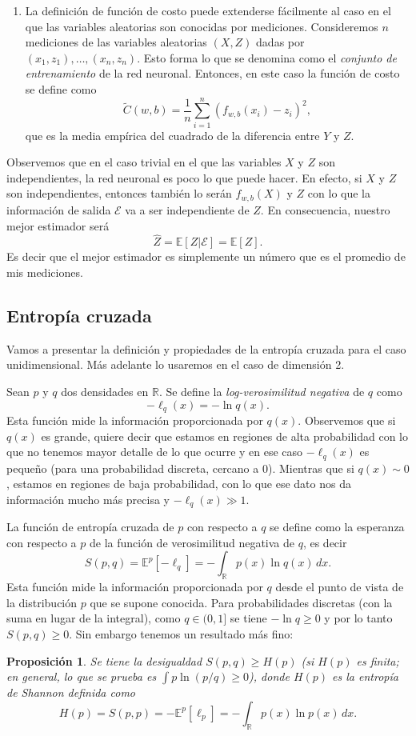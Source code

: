 \documentclass[12pt, a4paper]{amsbook}
\newcommand{\R}{{\mathbb R}}
\newcommand{\E}{{\mathbb E}}
\newtheorem{prop}[teo]{Proposici\'on}
\theoremstyle{remark}
\theoremstyle{definition}
\numberwithin{section}{chapter}
\numberwithin{subsection}{section}
\numberwithin{equation}{section}
\numberwithin{figure}{chapter}
\begin{document}
\begin{enumerate}
\item La definición de función de costo puede extenderse fácilmente al caso en el que las variables aleatorias son conocidas por mediciones. Consideremos $n$ mediciones de las variables aleatorias $(X, Z)$ dadas por $(x_1, z_1),\dots,(x_n,z_n)$. Esto forma lo que se denomina como el {\em conjunto de entrenamiento} de la red neuronal. Entonces, en este caso la función de costo se define como 
$$
\tilde C(w, b) = \frac{1}{n}\sum_{i=1}^n (f_{w, b}(x_i)-z_i)^2,
$$
que es la media empírica del cuadrado de la diferencia entre $Y$ y $Z$.
\end{enumerate}

Observemos que en el caso trivial en el que las variables $X$ y $Z$ son independientes, la red neuronal es poco lo que puede hacer. En efecto, si $X$ y $Z$ son independientes, entonces también lo serán $f_{w, b}(X)$ y $Z$ con lo que la información de salida $\mathcal E$ va a ser independiente de $Z$. En consecuencia, nuestro mejor estimador será
$$
\hat Z=\E[Z|\mathcal E] = \E[Z].
$$
Es decir que el mejor estimador es simplemente un número que es el promedio de mis mediciones.

\subsection{Entropía cruzada}

Vamos a presentar la definición y propiedades de la entropía cruzada para el caso unidimensional. Más adelante lo usaremos en el caso de dimensión 2. 

Sean $p$ y $q$ dos densidades en $\R$. Se define la {\em log-verosimilitud negativa} de $q$ como 
$$
-\ell_q(x) = -\ln q(x).
$$
Esta función mide la información proporcionada por $q(x)$. Observemos que si $q(x)$ es grande, quiere decir que estamos en regiones de alta probabilidad con lo que no tenemos mayor detalle de lo que ocurre y en ese caso $-\ell_q(x)$ es pequeño (para una probabilidad discreta, cercano a $0$). Mientras que si $q(x)\sim 0$, estamos en regiones de baja probabilidad, con lo que ese dato nos da información mucho más precisa y $-\ell_q(x)\gg 1$.

La función de entropía cruzada de $p$ con respecto a $q$ se define como la esperanza con respecto a $p$ de la función de verosimilitud negativa de $q$, es decir
$$
S(p, q) = \E^p[-\ell_q] = -\int_\R p(x)\ln q(x)\, dx.
$$
Esta función mide la información proporcionada por $q$ desde el punto de vista de la distribución $p$ que se supone conocida. Para probabilidades discretas (con la suma en lugar de la integral), como $q\in (0,1]$ se tiene $-\ln q\ge0$ y por lo tanto $S(p, q)\ge 0$. Sin embargo tenemos un resultado más fino:
\begin{prop}\label{cota.entropia}
Se tiene la desigualdad $S(p, q)\ge H(p)$ (si $H(p)$ es finita; en general, lo que se prueba es $\int p\ln(p/q)\ge 0$), donde $H(p)$ es la {\em entropía de Shannon} definida como
$$
H(p) = S(p, p) = -\E^p[\ell_p] = -\int_\R p(x)\ln p(x)\, dx.
$$
\end{prop}
\end{document}
